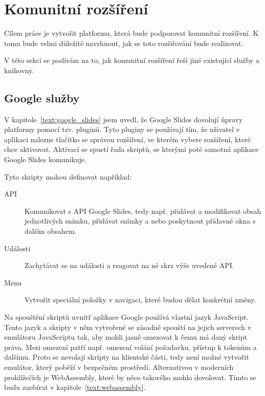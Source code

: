 \section{Komunitní rozšíření}\label{text:community_plugins}

Cílem práce je vytvořit platformu, která bude podporovat komunitní rozšíření.
K tomu bude velmi důležité navrhnout, jak se toto rozšiřování bude realizovat.

V této sekci se podívám na to, jak komunitní rozšíření řeší jiné existující služby a knihovny.

\subsection{Google služby}

V kapitole~\ref{text:google_slides} jsem uvedl, že Google Slides dovolují úpravy platformy pomocí tzv. pluginů.
Tyto pluginy se používají tím, že uživatel v aplikaci nalezne tlačítko se správou rozšíření, ve kterém vybere rozšíření, které chce aktivovat.
Aktivací se spustí řada skriptů, se kterými poté samotná aplikace Google Slides komunikuje.

Tyto skripty mohou definovat například:

\begin{description}
    \item[API] Komunikovat s API Google Slides, tedy např. přidávat a modifikovat obsah jednotlivých snímku, přidávat snímky a nebo poskytnout přídavné okna s dalším obsahem.
    \item[Události] Zachytávat se na události a reagovat na ně skrz výše uvedené API.
    \item[Menu] Vytvořit speciální položky v navigaci, které budou dělat konkrétní změny.
\end{description}

Na spouštění skriptů uvnitř aplikace Google používá vlastní jazyk JavaScript.
Tento jazyk a skripty v něm vytvořené se zásadně spouští na jejich serverech v emulátoru JavaScriptu tak, aby mohli jasně omezovat k čemu má daný skript práva. 
Mezi omezení patří např. omezení volání požadavku, přístup k tokenům a dalšímu.
Proto se nevolají skripty na klientské části, tedy není možné vytvořit emulátor, který poběží v bezpečném prostředí.
Alternativou v moderních prohlížečích je WebAssembly, které by něco takového mohlo dovolovat.
Tímto se budu zaobírat v kapitole~\ref{text:webassembly}.

